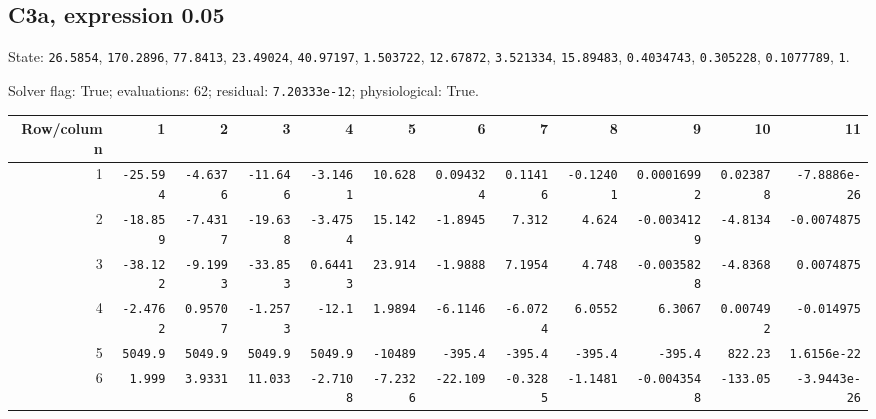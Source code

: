 \begin{landscape}
\subsection*{C3a, expression 0.05}
{\scriptsize State: \texttt{26.5854}, \texttt{170.2896}, \texttt{77.8413}, \texttt{23.49024}, \texttt{40.97197}, \texttt{1.503722}, \texttt{12.67872}, \texttt{3.521334}, \texttt{15.89483}, \texttt{0.4034743}, \texttt{0.305228}, \texttt{0.1077789}, \texttt{1}.\par

Solver flag: True; evaluations: 62; residual: \texttt{7.20333e-12}; physiological: True.\par}

\begingroup\scriptsize\setlength{\tabcolsep}{3pt}\centering
\begin{tabular}{rrrrrrrrrrrr}\toprule

Row/column & 1 & 2 & 3 & 4 & 5 & 6 & 7 & 8 & 9 & 10 & 11 \\ \midrule

1 & \texttt{-25.594} & \texttt{-4.6376} & \texttt{-11.646} & \texttt{-3.1461} & \texttt{10.628} & \texttt{0.094324} & \texttt{0.11416} & \texttt{-0.12401} & \texttt{0.00016992} & \texttt{0.023878} & \texttt{-7.8886e-26} \\

2 & \texttt{-18.859} & \texttt{-7.4317} & \texttt{-19.638} & \texttt{-3.4754} & \texttt{15.142} & \texttt{-1.8945} & \texttt{7.312} & \texttt{4.624} & \texttt{-0.0034129} & \texttt{-4.8134} & \texttt{-0.0074875} \\

3 & \texttt{-38.122} & \texttt{-9.1993} & \texttt{-33.853} & \texttt{0.64413} & \texttt{23.914} & \texttt{-1.9888} & \texttt{7.1954} & \texttt{4.748} & \texttt{-0.0035828} & \texttt{-4.8368} & \texttt{0.0074875} \\

4 & \texttt{-2.4762} & \texttt{0.95707} & \texttt{-1.2573} & \texttt{-12.1} & \texttt{1.9894} & \texttt{-6.1146} & \texttt{-6.0724} & \texttt{6.0552} & \texttt{6.3067} & \texttt{0.007492} & \texttt{-0.014975} \\

5 & \texttt{5049.9} & \texttt{5049.9} & \texttt{5049.9} & \texttt{5049.9} & \texttt{-10489} & \texttt{-395.4} & \texttt{-395.4} & \texttt{-395.4} & \texttt{-395.4} & \texttt{822.23} & \texttt{1.6156e-22} \\

6 & \texttt{1.999} & \texttt{3.9331} & \texttt{11.033} & \texttt{-2.7108} & \texttt{-7.2326} & \texttt{-22.109} & \texttt{-0.3285} & \texttt{-1.1481} & \texttt{-0.0043548} & \texttt{-133.05} & \texttt{-3.9443e-26} \\


\end{tabular}
\end{landscape}
